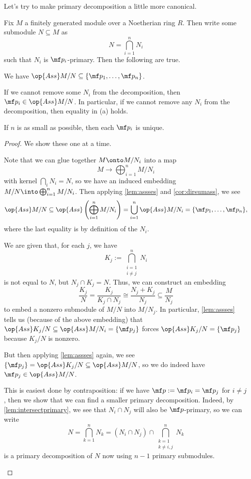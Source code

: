 Let's try to make primary decomposition a little more canonical.
\begin{theorem} \label{thm:primdecompii}
	Fix $M$ a finitely generated module over a Noetherian ring $R$. Then write some submodule $N\subseteq M$ as
	\[N=\bigcap_{i=1}^nN_i\]
	such that $N_i$ is $\mf p_i$-primary. Then the following are true.
	\begin{listalph}
		\item We have $\op{Ass}M/N\subseteq\{\mf p_1,\ldots,\mf p_n\}$.
		\item If we cannot remove some $N_i$ from the decomposition, then $\mf p_i\in\op{Ass}M/N$. In particular, if we cannot remove any $N_i$ from the decomposition, then equality in (a) holds.
		\item If $n$ is as small as possible, then each $\mf p_i$ is unique.
	\end{listalph}
\end{theorem}
\begin{proof}
	We show these one at a time.
	\begin{listalph}
		\item Note that we can glue together $M\onto M/N_i$ into a map
		\[M\to\bigoplus_{i=1}^nM/N_i\]
		with kernel $\bigcap_iN_i=N$, so we have an induced embedding $M/N\into\bigoplus_{i=1}^nM/N_i$. Then applying \autoref{lem:assses} and \autoref{cor:dirsumass}, we see
		\[\op{Ass}M/N\subseteq\op{Ass}\left(\bigoplus_{i=1}^nM/N_i\right)=\bigcup_{i=1}^n\op{Ass}M/N_i=\{\mf p_1,\ldots,\mf p_n\},\]
		where the last equality is by definition of the $N_i$.

		\item We are given that, for each $j$, we have
		\[K_j:=\bigcap_{\substack{i=1\\i\ne j}}^nN_i\]
		is not equal to $N$, but $N_j\cap K_j=N$. Thus, we can construct an embedding
		\[\frac{K_j}N=\frac{K_j}{K_j\cap N_j}\cong\frac{N_j+K_j}{N_j}\subseteq\frac M{N_j}\]
		to embed a nonzero submodule of $M/N$ into $M/N_j$. In particular, \autoref{lem:assses} tells us (because of the above embedding) that $\op{Ass}K_j/N\subseteq\op{Ass}M/N_i=\{\mf p_j\}$ forces $\op{Ass}K_j/N=\{\mf p_j\}$ because $K_j/N$ is nonzero.
		
		But then applying \autoref{lem:assses} again, we see $\{\mf p_j\}=\op{Ass}K_j/N\subseteq\op{Ass}M/N$, so we do indeed have $\mf p_j\in\op{Ass}M/N$.

		\item This is easiest done by contraposition: if we have $\mf p:=\mf p_i=\mf p_j$ for $i\ne j$, then we show that we can find a smaller primary decomposition. Indeed, by \autoref{lem:intersectprimary}, we see that $N_i\cap N_j$ will also be $\mf p$-primary, so we can write
		\[N=\bigcap_{k=1}^nN_k=(N_i\cap N_j)\cap\bigcap_{\substack{k=1\\k\ne i,j}}^nN_k\]
		is a primary decomposition of $N$ now using $n-1$ primary submodules.
		\qedhere
	\end{listalph}
\end{proof}
